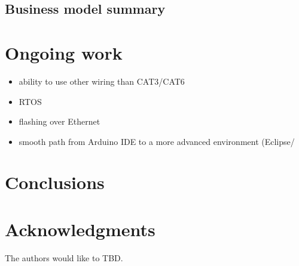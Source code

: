 \documentclass[draft,a4paper]{siamltex}
\begin{document}
\subsection{Business model summary}


\section{Ongoing work}
\label{sec:ongoing}

\begin{itemize}
  \item ability to use other wiring than CAT3/CAT6
  \item RTOS
  \item flashing over Ethernet
  \item smooth path from Arduino IDE to a more advanced environment
    (Eclipse/
\end{itemize}


\section{Conclusions}
\label{sec:conclusions}

\section*{Acknowledgments}

The authors would like to TBD.

{}

\end{document}
